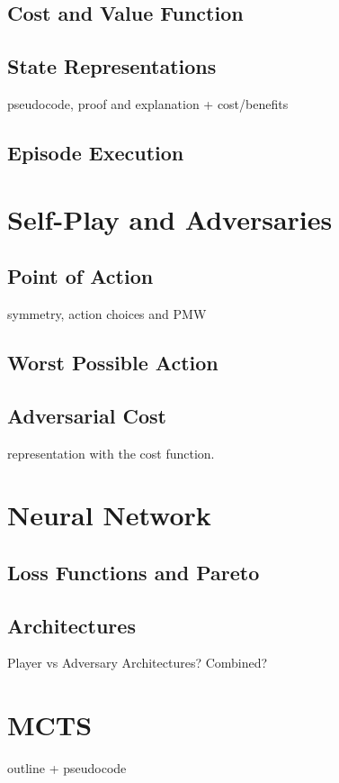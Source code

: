 \documentclass[main.tex]{subfiles}
\begin{document}
\subsection{Cost and Value Function}




\subsection{State Representations}
pseudocode, proof and explanation + cost/benefits

\subsection{Episode Execution}

\section{Self-Play and Adversaries}

\subsection{Point of Action}
symmetry, action choices and PMW

\subsection{Worst Possible Action}

\subsection{Adversarial Cost}
representation with the cost function.

\section{Neural Network}
\subsection{Loss Functions and Pareto}

\subsection{Architectures}
Player vs Adversary Architectures? Combined?

\section{MCTS}
outline + pseudocode
\end{document}
